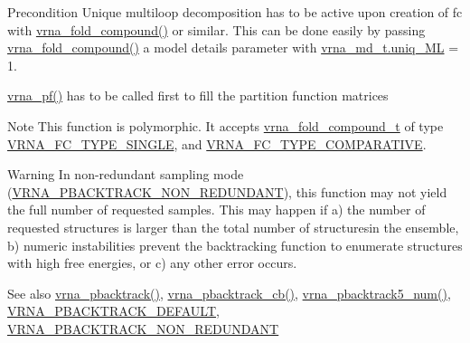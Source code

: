 \begin{DoxyPrecond}{Precondition}
Unique multiloop decomposition has to be active upon creation of {\ttfamily fc} with \mbox{\hyperlink{group__fold__compound_ga6601d994ba32b11511b36f68b08403be}{vrna\+\_\+fold\+\_\+compound()}} or similar. This can be done easily by passing \mbox{\hyperlink{group__fold__compound_ga6601d994ba32b11511b36f68b08403be}{vrna\+\_\+fold\+\_\+compound()}} a model details parameter with \mbox{\hyperlink{group__model__details_ade065b814a4e2e72ead93ab502613ed2}{vrna\+\_\+md\+\_\+t.\+uniq\+\_\+\+ML}} = 1. 

\mbox{\hyperlink{group__part__func__global_ga29e256d688ad221b78d37f427e0e99bc}{vrna\+\_\+pf()}} has to be called first to fill the partition function matrices
\end{DoxyPrecond}
\begin{DoxyNote}{Note}
This function is polymorphic. It accepts \mbox{\hyperlink{group__fold__compound_ga1b0cef17fd40466cef5968eaeeff6166}{vrna\+\_\+fold\+\_\+compound\+\_\+t}} of type \mbox{\hyperlink{group__fold__compound_gga01a4ff86fa71deaaa5d1abbd95a1447da7e264dd3cf2dc9b6448caabcb7763cd6}{V\+R\+N\+A\+\_\+\+F\+C\+\_\+\+T\+Y\+P\+E\+\_\+\+S\+I\+N\+G\+LE}}, and \mbox{\hyperlink{group__fold__compound_gga01a4ff86fa71deaaa5d1abbd95a1447dab821ce46ea3cf665be97df22a76f5023}{V\+R\+N\+A\+\_\+\+F\+C\+\_\+\+T\+Y\+P\+E\+\_\+\+C\+O\+M\+P\+A\+R\+A\+T\+I\+VE}}.
\end{DoxyNote}
\begin{DoxyWarning}{Warning}
In non-\/redundant sampling mode (\mbox{\hyperlink{group__subopt__stochbt_ga9d580ce645aa0c38b69afdf56c332200}{V\+R\+N\+A\+\_\+\+P\+B\+A\+C\+K\+T\+R\+A\+C\+K\+\_\+\+N\+O\+N\+\_\+\+R\+E\+D\+U\+N\+D\+A\+NT}}), this function may not yield the full number of requested samples. This may happen if a) the number of requested structures is larger than the total number of structuresin the ensemble, b) numeric instabilities prevent the backtracking function to enumerate structures with high free energies, or c) any other error occurs.
\end{DoxyWarning}
\begin{DoxySeeAlso}{See also}
\mbox{\hyperlink{group__subopt__stochbt_ga594844ac73c4e66e00d6791b31540634}{vrna\+\_\+pbacktrack()}}, \mbox{\hyperlink{group__subopt__stochbt_ga843fa953a15337b15cc68401adad84d7}{vrna\+\_\+pbacktrack\+\_\+cb()}}, \mbox{\hyperlink{group__subopt__stochbt_ga30c3ddff868c44eecfdb07d99a2422ba}{vrna\+\_\+pbacktrack5\+\_\+num()}}, \mbox{\hyperlink{group__subopt__stochbt_ga760aa2fb2d5e3d7521a11454a21e9b9f}{V\+R\+N\+A\+\_\+\+P\+B\+A\+C\+K\+T\+R\+A\+C\+K\+\_\+\+D\+E\+F\+A\+U\+LT}}, \mbox{\hyperlink{group__subopt__stochbt_ga9d580ce645aa0c38b69afdf56c332200}{V\+R\+N\+A\+\_\+\+P\+B\+A\+C\+K\+T\+R\+A\+C\+K\+\_\+\+N\+O\+N\+\_\+\+R\+E\+D\+U\+N\+D\+A\+NT}}
\end{DoxySeeAlso}

